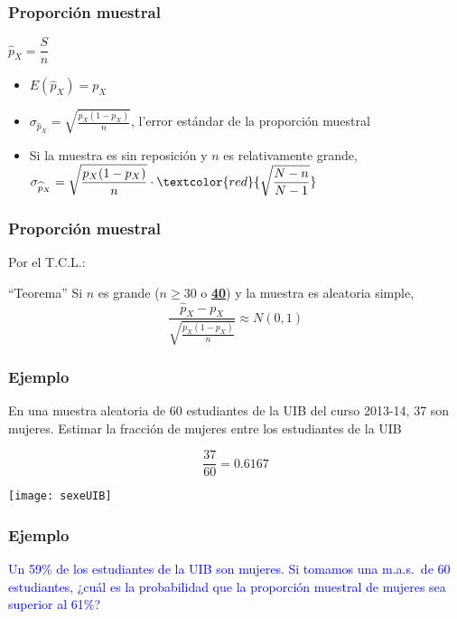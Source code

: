 \documentclass[12pt,t]{beamer}
\newcommand{\red}[1]{\textcolor{red}{#1}}
\newcommand{\blue}[1]{\textcolor{blue}{#1}}
\renewcommand{\emph}[1]{{\color{red}#1}}
\renewcommand{\geq}{\geqslant}
\theoremstyle{plain}
\theoremstyle{definition}
\begin{document}
\begin{frame}
\frametitle{Proporción  muestral}
$\widehat{p}_X=\dfrac{S}{n}$
\medskip

\begin{itemize}
\item $E(\widehat{p}_X)=p_X$
\medskip


\item $\displaystyle \sigma_{\widehat{p}_X}=\sqrt{\frac{p_X(1-p_X)}{n}}$, l'\emph{error estándar} de la proporción muestral
\medskip

\item Si la muestra es sin reposición y $n$ es relativamente grande,
$\displaystyle\sigma_{\widehat{p}_X}=\sqrt{\frac{p_X(1-p_X)}{n}}\cdot\red{\sqrt{\frac{N-n}{N-1}}}$
\end{itemize}

\end{frame}


\begin{frame}
\frametitle{Proporción  muestral}
\vspace*{-2ex}

Por el  T.C.L.:

\begin{block}{``Teorema''}
Si $n$ es grande (\emph{$n\geq 30$ o \underline{\textbf{40}}}) y la muestra es aleatoria simple, 
$$
\frac{\widehat{p}_X-p_X}{\sqrt{\frac{{p}_X(1-{p}_X)}{n}}}\approx N(0,1)
$$
\end{block}

\end{frame}


\begin{frame}
\frametitle{Ejemplo}
\vspace*{-2ex}

En una muestra aleatoria de 60 estudiantes de la UIB del curso 2013-14, 37 son mujeres. Estimar la fracción de mujeres entre los estudiantes de la UIB
\medskip

$$
\frac{37}{60}=0.6167
$$
\vspace*{-2ex}

\begin{center}
\texttt{[image: sexeUIB]}
\end{center}


\end{frame}


\begin{frame}
\frametitle{Ejemplo}
\vspace*{-2ex}

\blue{Un  59\% de los estudiantes de la UIB son  mujeres. Si tomamos una m.a.s.\ de 60 estudiantes, ¿cuál es la probabilidad que la proporción muestral de mujeres sea superior al 61\%?}
\medskip 


   
\end{frame}
\end{document}

